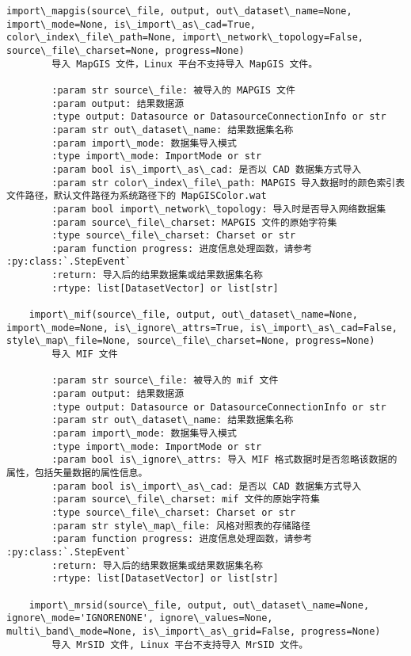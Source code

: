 \documentclass[11pt]{article}
\begin{document}
\begin{Verbatim}[commandchars=\\\{\}]
    import\_mapgis(source\_file, output, out\_dataset\_name=None, import\_mode=None, is\_import\_as\_cad=True, color\_index\_file\_path=None, import\_network\_topology=False, source\_file\_charset=None, progress=None)
        导入 MapGIS 文件，Linux 平台不支持导入 MapGIS 文件。
        
        :param str source\_file: 被导入的 MAPGIS 文件
        :param output: 结果数据源
        :type output: Datasource or DatasourceConnectionInfo or str
        :param str out\_dataset\_name: 结果数据集名称
        :param import\_mode: 数据集导入模式
        :type import\_mode: ImportMode or str
        :param bool is\_import\_as\_cad: 是否以 CAD 数据集方式导入
        :param str color\_index\_file\_path: MAPGIS 导入数据时的颜色索引表文件路径，默认文件路径为系统路径下的 MapGISColor.wat
        :param bool import\_network\_topology: 导入时是否导入网络数据集
        :param source\_file\_charset: MAPGIS 文件的原始字符集
        :type source\_file\_charset: Charset or str
        :param function progress: 进度信息处理函数，请参考 :py:class:`.StepEvent`
        :return: 导入后的结果数据集或结果数据集名称
        :rtype: list[DatasetVector] or list[str]
    
    import\_mif(source\_file, output, out\_dataset\_name=None, import\_mode=None, is\_ignore\_attrs=True, is\_import\_as\_cad=False, style\_map\_file=None, source\_file\_charset=None, progress=None)
        导入 MIF 文件
        
        :param str source\_file: 被导入的 mif 文件
        :param output: 结果数据源
        :type output: Datasource or DatasourceConnectionInfo or str
        :param str out\_dataset\_name: 结果数据集名称
        :param import\_mode: 数据集导入模式
        :type import\_mode: ImportMode or str
        :param bool is\_ignore\_attrs: 导入 MIF 格式数据时是否忽略该数据的属性，包括矢量数据的属性信息。
        :param bool is\_import\_as\_cad: 是否以 CAD 数据集方式导入
        :param source\_file\_charset: mif 文件的原始字符集
        :type source\_file\_charset: Charset or str
        :param str style\_map\_file: 风格对照表的存储路径
        :param function progress: 进度信息处理函数，请参考 :py:class:`.StepEvent`
        :return: 导入后的结果数据集或结果数据集名称
        :rtype: list[DatasetVector] or list[str]
    
    import\_mrsid(source\_file, output, out\_dataset\_name=None, ignore\_mode='IGNORENONE', ignore\_values=None, multi\_band\_mode=None, is\_import\_as\_grid=False, progress=None)
        导入 MrSID 文件, Linux 平台不支持导入 MrSID 文件。
        

\end{Verbatim}
\end{document}
